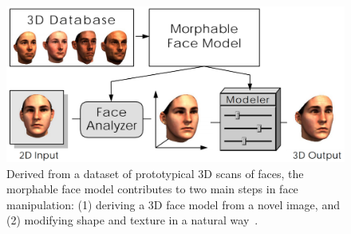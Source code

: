 \begin{figure}[t]
\centering
    \includegraphics[width=1.0\columnwidth]{fig/img/blanz_sig99_face.pdf}
    \caption{Derived from a dataset of prototypical 3D scans of faces, the morphable face model contributes to two main steps in face manipulation: (1) deriving a 3D face model from a novel image, and (2) modifying shape and texture in a natural way~\protect\cite{Blanz:1999:MMS}.}
    \label{fig:blanz_sig99_face}
\end{figure}

